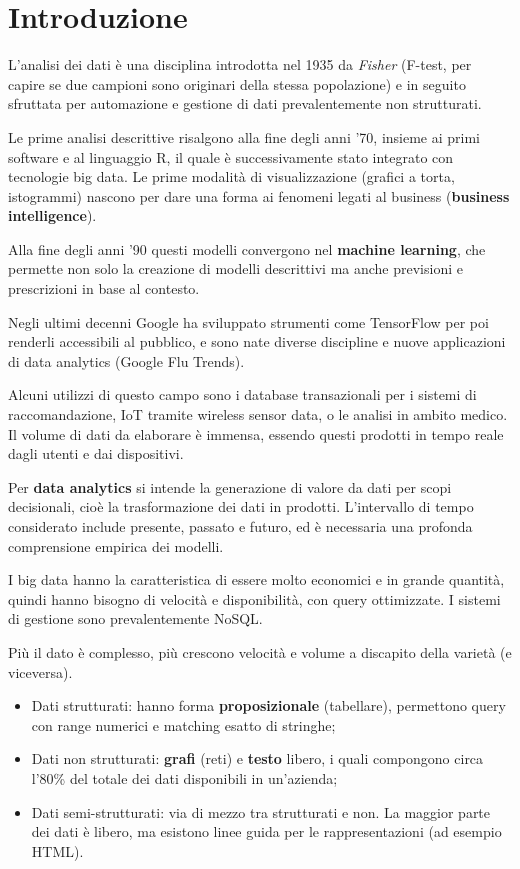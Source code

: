\section{Introduzione}

L'analisi dei dati è una disciplina introdotta nel 1935 da \textit{Fisher} (F-test, per capire se due campioni sono originari della stessa popolazione) e in seguito sfruttata per automazione e gestione di dati prevalentemente non strutturati.

Le prime analisi descrittive risalgono alla fine degli anni '70, insieme ai primi software e al linguaggio R, il quale è successivamente stato integrato con tecnologie big data. Le prime modalità di visualizzazione (grafici a torta, istogrammi) nascono per dare una forma ai fenomeni legati al business (\textbf{business intelligence}). 

Alla fine degli anni '90 questi modelli convergono nel \textbf{machine learning}, che permette non solo la creazione di modelli descrittivi ma anche previsioni e prescrizioni in base al contesto. 

Negli ultimi decenni Google ha sviluppato strumenti come TensorFlow per poi renderli accessibili al pubblico, e sono nate diverse discipline e nuove applicazioni di data analytics (Google Flu Trends).

Alcuni utilizzi di questo campo sono i database transazionali per i sistemi di raccomandazione, IoT tramite wireless sensor data, o le analisi in ambito medico. Il volume di dati da elaborare è immensa, essendo questi prodotti in tempo reale dagli utenti e dai dispositivi. 

Per \textbf{data analytics} si intende la generazione di valore da dati per scopi decisionali, cioè la trasformazione dei dati in prodotti. L'intervallo di tempo considerato include presente, passato e futuro, ed è necessaria una profonda comprensione empirica dei modelli.

I big data hanno la caratteristica di essere molto economici e in grande quantità, quindi hanno bisogno di velocità e disponibilità, con query ottimizzate. I sistemi di gestione sono prevalentemente NoSQL. 

Più il dato è complesso, più crescono velocità e volume a discapito della varietà (e viceversa).
\begin{itemize}
	\item Dati strutturati: hanno forma \textbf{proposizionale} (tabellare), permettono query con range numerici e matching esatto di stringhe;
	\item Dati non strutturati: \textbf{grafi} (reti) e \textbf{testo} libero, i quali compongono circa l'80\% del totale dei dati disponibili in un'azienda;
	\item Dati semi-strutturati: via di mezzo tra strutturati e non. La maggior parte dei dati è libero, ma esistono linee guida per le rappresentazioni (ad esempio HTML).
\end{itemize}

